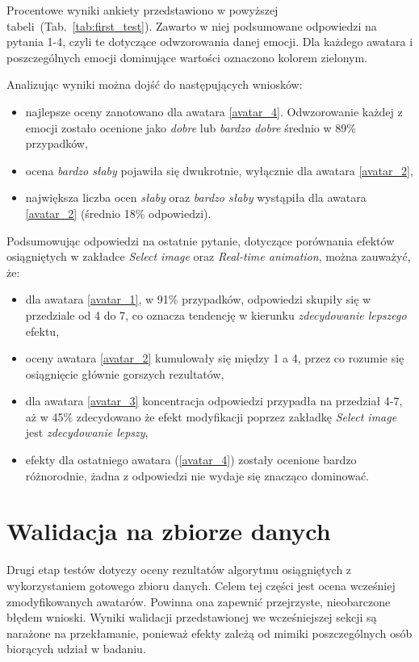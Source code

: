 Procentowe wyniki ankiety przedstawiono w powyższej tabeli~(Tab.~\ref{tab:first_test}). Zawarto w niej podsumowane odpowiedzi na pytania 1-4, czyli te dotyczące odwzorowania danej emocji. Dla każdego awatara i poszczególnych emocji dominujące wartości oznaczono kolorem zielonym. 

Analizując wyniki można dojść do następujących wniosków:
\begin{itemize}
    \item najlepsze oceny zanotowano dla awatara \ref{avatar_4}. Odwzorowanie każdej z emocji zostało ocenione jako \textit{dobre} lub \textit{bardzo dobre} średnio w 89\% przypadków,
    \item ocena \textit{bardzo słaby} pojawiła się dwukrotnie, wyłącznie dla awatara \ref{avatar_2},
    \item największa liczba ocen \textit{słaby} oraz \textit{bardzo słaby} wystąpiła dla awatara \ref{avatar_2} (średnio 18\% odpowiedzi).
\end{itemize}

\newpage
Podsumowując odpowiedzi na ostatnie pytanie, dotyczące porównania efektów osiągniętych w zakładce \textit{Select image} oraz \textit{Real-time animation}, można zauważyć, że:
\begin{itemize}
    \item dla awatara \ref{avatar_1}, w 91\% przypadków, odpowiedzi skupiły się w przedziale od 4 do 7, co oznacza tendencję w kierunku \textit{zdecydowanie lepszego} efektu,
    \item oceny awatara \ref{avatar_2} kumulowały się między 1 a 4, przez co rozumie się osiągnięcie głównie gorszych rezultatów,
    \item dla awatara \ref{avatar_3} koncentracja odpowiedzi przypadła na przedział 4-7, aż w 45\% zdecydowano że efekt modyfikacji poprzez zakładkę \textit{Select image} jest \textit{zdecydowanie lepszy},
    \item efekty dla ostatniego awatara (\ref{avatar_4}) zostały ocenione bardzo różnorodnie, żadna z odpowiedzi nie wydaje się znacząco dominować.
\end{itemize}



\section{Walidacja na zbiorze danych}
Drugi etap testów dotyczy oceny rezultatów algorytmu osiągniętych z wykorzystaniem gotowego zbioru danych. Celem tej części jest ocena wcześniej zmodyfikowanych awatarów. Powinna ona zapewnić przejrzyste, nieobarczone błędem wnioski. Wyniki walidacji przedstawionej we wcześniejszej sekcji są narażone na przekłamanie, ponieważ efekty zależą od mimiki poszczególnych osób biorących udział w badaniu.


